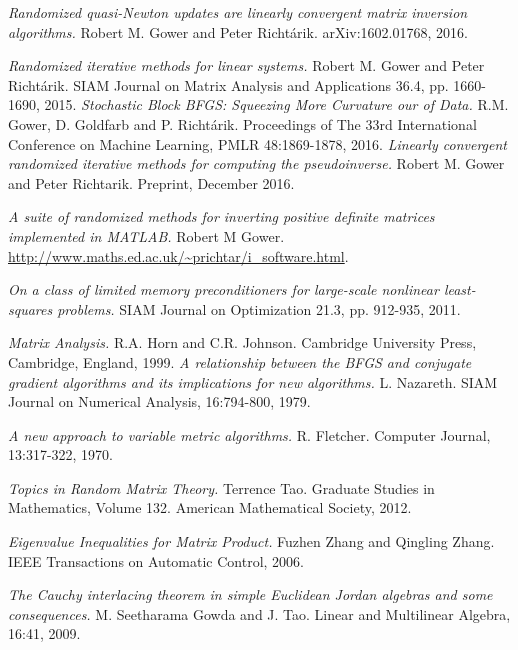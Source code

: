 \documentclass[12pt,conference,compsocconf]{IEEEtran}
\begin{document}

%
\begin{thebibliography}{1}

\textit{Randomized quasi-Newton updates are linearly convergent matrix inversion algorithms.}
Robert M. Gower and Peter Richt\'arik. arXiv:1602.01768, 2016.

\textit{Randomized iterative methods for linear systems.} Robert M. Gower and Peter Richt\'arik. SIAM Journal on Matrix Analysis and Applications 36.4, pp. 1660-1690, 2015.
\textit{Stochastic Block BFGS: Squeezing More Curvature our of Data.} R.M. Gower, D. Goldfarb and P. Richt\'arik. Proceedings of The 33rd International Conference on Machine Learning, PMLR 48:1869-1878, 2016.
\textit{Linearly convergent randomized iterative methods for computing the pseudoinverse.} Robert M. Gower and Peter Richtarik. Preprint, December 2016.

\textit{A suite of randomized methods for inverting positive definite matrices implemented in MATLAB.} Robert M Gower. \url{http://www.maths.ed.ac.uk/~prichtar/i_software.html}.

\textit{On a class of limited memory preconditioners for large-scale nonlinear least-squares problems.} SIAM Journal on Optimization 21.3, pp. 912-935, 2011.

\textit{Matrix Analysis.} R.A. Horn and C.R. Johnson. Cambridge University Press, Cambridge, England, 1999.
\textit{A relationship between the BFGS and conjugate gradient algorithms and its implications for new algorithms.} L. Nazareth. SIAM Journal on Numerical Analysis, 16:794-800, 1979.

\textit{A new approach to variable metric algorithms.} R. Fletcher. Computer Journal, 13:317-322, 1970.

\textit{Topics in Random Matrix Theory.} Terrence Tao. Graduate Studies in Mathematics, Volume 132. American Mathematical Society, 2012.

\textit{Eigenvalue Inequalities for Matrix Product.} Fuzhen Zhang and Qingling Zhang. IEEE Transactions on Automatic Control, 2006.

\textit{The Cauchy interlacing theorem in simple Euclidean Jordan algebras and some consequences.}
M. Seetharama Gowda and J. Tao. Linear and Multilinear Algebra, 16:41, 2009.


\end{thebibliography}
\end{document}
